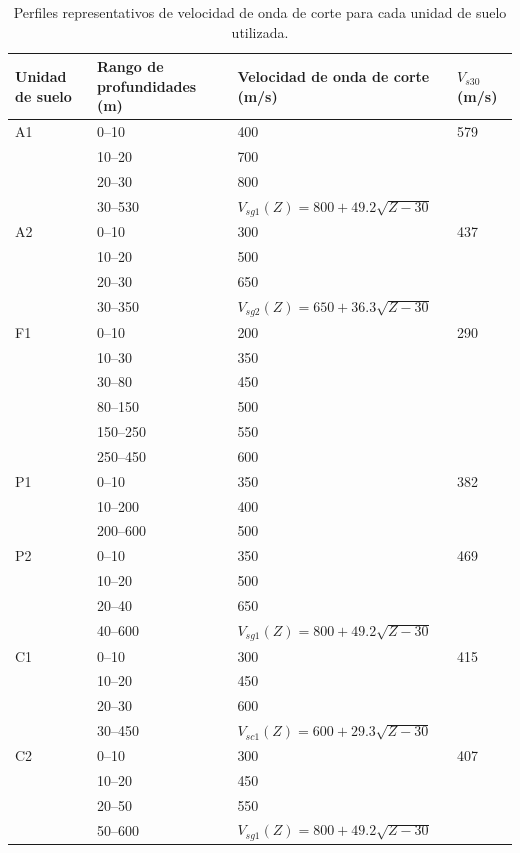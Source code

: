 \begin{table}[H]
\centering
\begin{threeparttable}
\captionsetup{justification=raggedright, singlelinecheck=false}
\caption{Perfiles representativos de velocidad de onda de corte para cada unidad de suelo utilizada.}
\label{tab:perfiles_vs}
\begin{tabular}{p{3cm}p{3.5cm}p{5.5cm}p{2cm}}
\toprule
\textbf{Unidad de suelo} & \textbf{Rango de profundidades (m)} & \textbf{Velocidad de onda de corte (m/s)} & \(V_{s30}\) (m/s) \\ 
\midrule
A1 
  & 0–10 & 400 & 579 \\ 
  & 10–20 & 700 & \\ 
  & 20–30 & 800 & \\ 
  & 30–530 & \(V_{sg1}(Z) = 800 + 49.2 \sqrt{Z - 30}\) & \\ 
A2 
  & 0–10 & 300 & 437 \\ 
  & 10–20 & 500 & \\ 
  & 20–30 & 650 & \\ 
  & 30–350 & \(V_{sg2}(Z) = 650 + 36.3 \sqrt{Z - 30}\) & \\ 
F1 
  & 0–10 & 200 & 290 \\ 
  & 10–30 & 350 & \\ 
  & 30–80 & 450 & \\ 
  & 80–150 & 500 & \\ 
  & 150–250 & 550 & \\ 
  & 250–450 & 600 & \\ 
P1 
  & 0–10 & 350 & 382 \\ 
  & 10–200 & 400 & \\ 
  & 200–600 & 500 & \\ 
P2 
  & 0–10 & 350 & 469 \\ 
  & 10–20 & 500 & \\ 
  & 20–40 & 650 & \\ 
  & 40–600 & \(V_{sg1}(Z) = 800 + 49.2 \sqrt{Z - 30}\) & \\ 
C1 
  & 0–10 & 300 & 415 \\ 
  & 10–20 & 450 & \\ 
  & 20–30 & 600 & \\ 
  & 30–450 & \(V_{sc1}(Z) = 600 + 29.3 \sqrt{Z - 30}\) & \\ 
C2 
  & 0–10 & 300 & 407 \\ 
  & 10–20 & 450 & \\ 
  & 20–50 & 550 & \\ 
  & 50–600 & \(V_{sg1}(Z) = 800 + 49.2 \sqrt{Z - 30}\) & \\ 

\end{tabular}
\end{threeparttable}
\end{table}
